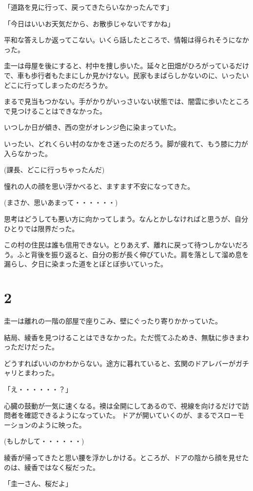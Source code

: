 ﻿\documentclass[book,tate]{jlreq}
\begin{document}
「道路を見に行って、戻ってきたらいなかったんです」

「今日はいいお天気だから、お散歩じゃないですかね」

平和な答えしか返ってこない。いくら話したところで、情報は得られそうになかった。

圭一は母屋を後にすると、村中を捜し歩いた。延々と田畑がひろがっているだけで、車も歩行者もたまにしか見かけない。民家もまばらしかないのに、いったいどこに行ってしまったのだろうか。

まるで見当もつかない。手がかりがいっさいない状態では、闇雲に歩いたところで見つけることはできなかった。

いつしか日が傾き、西の空がオレンジ色に染まっていた。

いったい、どれくらい村のなかをさ迷ったのだろう。脚が疲れて、もう膝に力が入らなかった。

(課長、どこに行っちゃったんだ)

憧れの人の顔を思い浮かべると、ますます不安になってきた。

(まさか、思いあまって・・・・・・)

思考はどうしても悪い方に向かってしまう。なんとかしなければと思うが、自分ひとりでは限界だった。

この村の住民は誰も信用できない。とりあえず、離れに戻って待つしかないだろう。ふと背後を振り返ると、自分の影が長く伸びていた。肩を落として溜め息を漏らし、夕日に染まった道をとぼとぼ歩いていった。

\section*{2}

圭一は離れの一階の部屋で座りこみ、壁にぐったり寄りかかっていた。

結局、綾香を見つけることはできなかった。ただ慌てふためき、無駄に歩きまわっただけだった。 

どうすればいいのかわからない。途方に暮れていると、玄関のドアレバーがガチャリとまわった。

「え・・・・・・？」

心臓の鼓動が一気に速くなる。襖は全開にしてあるので、視線を向けるだけで訪問者を確認できるようになっていた。 ドアが開いていくのが、まるでスローモーションのように映った。

(もしかして・・・・・・)

綾香が帰ってきたと思い腰を浮かしかける。ところが、ドアの陰から顔を見せたのは、綾香ではなく桜だった。

「圭一さん、桜だよ」
\end{document}
